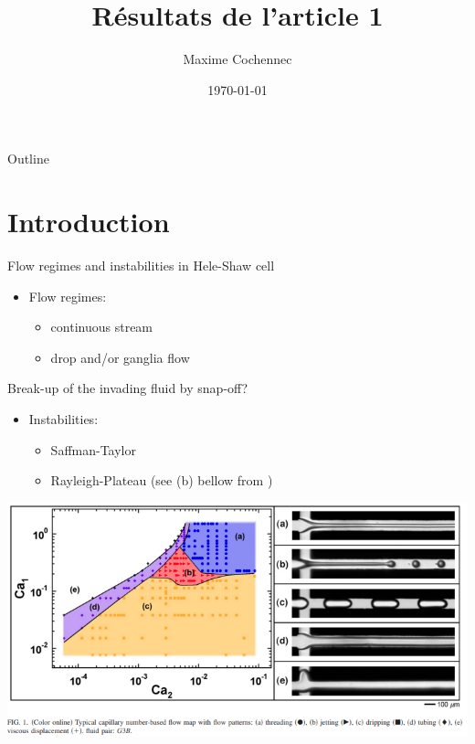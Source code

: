 \documentclass[presentation]{beamer}
\author{Maxime Cochennec}
\date{\today}
\title{Résultats de l'article 1}
\begin{document}
\maketitle
\begin{frame}{Outline}
\tableofcontents
\end{frame}



\section{Introduction}
\label{sec:org491c0a8}
\begin{frame}[label={sec:orgd908bc7}]{Flow regimes and instabilities in Hele-Shaw cell}
\begin{itemize}
\item Flow regimes:

\begin{itemize}
\item \alert{continuous stream}

\item drop and/or ganglia flow
\end{itemize}
\end{itemize}

Break-up of the invading fluid by snap-off? 

\begin{itemize}
\item Instabilities:

\begin{itemize}
\item Saffman-Taylor

\item Rayleigh-Plateau (see (b) bellow from \cite{cubaud2008capillary})
\end{itemize}
\end{itemize}

\centering
\includegraphics[scale=0.352]{cubaudMason.png}
\end{frame}
\end{document}
